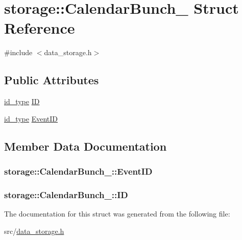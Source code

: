 \hypertarget{structstorage_1_1CalendarBunch__}{
\section{storage::CalendarBunch\_\- Struct Reference}
\label{d9/de4/structstorage_1_1CalendarBunch__}
}


{\ttfamily \#include $<$data\_\-storage.h$>$}

\subsection*{Public Attributes}
\begin{DoxyCompactItemize}
\item 
\hyperlink{types_8h_a0b60c08a3ab1435cccc5643d32d8ccee}{id\_\-type} \hyperlink{structstorage_1_1CalendarBunch___a519996ee57438ac30e1eea259358585f}{ID}
\item 
\hyperlink{types_8h_a0b60c08a3ab1435cccc5643d32d8ccee}{id\_\-type} \hyperlink{structstorage_1_1CalendarBunch___a87e88f8847e01128e2d2c21b9a0a284b}{EventID}
\end{DoxyCompactItemize}


\subsection{Member Data Documentation}
\hypertarget{structstorage_1_1CalendarBunch___a87e88f8847e01128e2d2c21b9a0a284b}{
\subsubsection[{EventID}]{ {\bf storage::CalendarBunch\_\-::EventID}}}
\label{d9/de4/structstorage_1_1CalendarBunch___a87e88f8847e01128e2d2c21b9a0a284b}
\hypertarget{structstorage_1_1CalendarBunch___a519996ee57438ac30e1eea259358585f}{
\subsubsection[{ID}]{ {\bf storage::CalendarBunch\_\-::ID}}}
\label{d9/de4/structstorage_1_1CalendarBunch___a519996ee57438ac30e1eea259358585f}


The documentation for this struct was generated from the following file:\begin{DoxyCompactItemize}
\item 
src/\hyperlink{data__storage_8h}{data\_\-storage.h}\end{DoxyCompactItemize}
